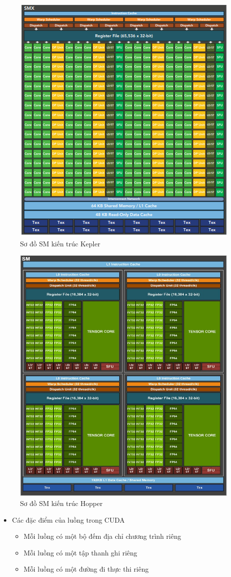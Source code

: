 \documentclass[14pt, a4paper]{article}
\numberwithin{equation}{section}
\numberwithin{figure}{section}
\numberwithin{dl}{section}
\numberwithin{md}{section}
\numberwithin{bd}{section}
\numberwithin{dn}{section}
\numberwithin{hq}{section}
\begin{document}
\begin{figure}[H]
    \centering
    \includegraphics[width=0.45\linewidth]{figures/CUDA/SM_Kepler_Architecture.png}
    \caption{Sơ đồ SM kiến trúc Kepler}
\end{figure}

\begin{figure}[H]
    \centering
    \includegraphics[width=0.45\linewidth]{figures/CUDA/SM_Hopper_Archtecture.jpg}
    \caption{Sơ đồ SM kiến trúc Hopper}
\end{figure}

\begin{itemize}
    \item Các đặc điểm của luồng trong CUDA
    \begin{itemize}
        \item Mỗi luồng có một bộ đếm địa chỉ chương trình riêng
        \item Mỗi luồng có một tập thanh ghi riêng
        \item Mỗi luồng có một đường đi thực thi riêng
    \end{itemize}
\end{itemize}
\end{document}
